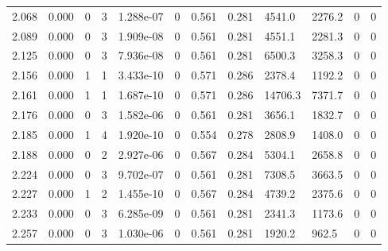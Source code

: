 \documentclass[preview]{standalone}
\begin{document}
{{{\begin{tabular}{L{1.2cm}C{1.2cm} C{0.3cm}C{0.5cm} C{1.4cm}C{1.4cm} C{1.4cm}C{1.4cm} C{1.6cm}C{1.6cm} C{1.6cm}C{1.6cm}}
  2.068  &  0.000  & 0     &  3 &  1.288e-07  & 0  &  0.561&   0.281& 4541.0 & 2276.2   &  0 & 0  \\ 
  2.089  &  0.000  & 0     &  3 &  1.909e-08  & 0  &  0.561&   0.281& 4551.1 & 2281.3   &  0 & 0  \\ 
  2.125  &  0.000  & 0     &  3 &  7.936e-08  & 0  &  0.561&   0.281& 6500.3 & 3258.3   &  0 & 0  \\ 
  2.156  &  0.000  & 1     &  1 &  3.433e-10  & 0  &  0.571&   0.286& 2378.4 & 1192.2   &  0 & 0  \\ 
  2.161  &  0.000  & 1     &  1 &  1.687e-10  & 0  &  0.571&   0.286& 14706.3 & 7371.7   &  0 & 0  \\ 
  2.176  &  0.000  & 0     &  3 &  1.582e-06  & 0  &  0.561&   0.281& 3656.1 & 1832.7   &  0 & 0  \\ 
  2.185  &  0.000  & 1     &  4 &  1.920e-10  & 0  &  0.554&   0.278& 2808.9 & 1408.0   &  0 & 0  \\ 
  2.188  &  0.000  & 0     &  2 &  2.927e-06  & 0  &  0.567&   0.284& 5304.1 & 2658.8   &  0 & 0  \\ 
  2.224  &  0.000  & 0     &  3 &  9.702e-07  & 0  &  0.561&   0.281& 7308.5 & 3663.5   &  0 & 0  \\ 
  2.227  &  0.000  & 1     &  2 &  1.455e-10  & 0  &  0.567&   0.284& 4739.2 & 2375.6   &  0 & 0  \\ 
  2.233  &  0.000  & 0     &  3 &  6.285e-09  & 0  &  0.561&   0.281& 2341.3 & 1173.6   &  0 & 0  \\ 
  2.257  &  0.000  & 0     &  3 &  1.030e-06  & 0  &  0.561&   0.281& 1920.2 & 962.5   &  0 & 0  \\ 
\hline 
\end{tabular} 

}}}
\end{document}
